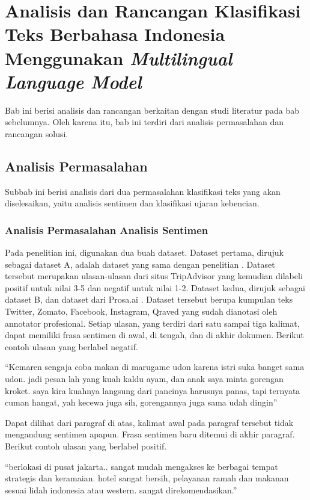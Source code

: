 \chapter{Analisis dan Rancangan Klasifikasi Teks Berbahasa Indonesia Menggunakan \textit{Multilingual Language Model}}

Bab ini berisi analisis dan rancangan berkaitan dengan studi literatur pada bab sebelumnya. Oleh karena itu, bab ini terdiri dari analisis permasalahan dan rancangan solusi.

\section{Analisis Permasalahan}
	Subbab ini berisi analisis dari dua permasalahan klasifikasi teks yang akan diselesaikan, yaitu analisis sentimen dan klasifikasi ujaran kebencian.

	\subsection{Analisis Permasalahan Analisis Sentimen}
	Pada penelitian ini, digunakan dua buah dataset. Dataset pertama, dirujuk sebagai dataset A, adalah dataset yang sama dengan penelitian \parencite{FarhanKhodra2017}. Dataset tersebut merupakan ulasan-ulasan dari situs TripAdvisor yang kemudian dilabeli positif untuk nilai 3-5 dan negatif untuk nilai 1-2. Dataset kedua, dirujuk sebagai dataset B,  dan dataset dari Prosa.ai \parencite{CrisdayantiPurwarianti2019}. Dataset tersebut berupa kumpulan teks Twitter, Zomato, Facebook, Instagram, Qraved yang sudah dianotasi oleh annotator profesional. Setiap ulasan, yang terdiri dari satu sampai tiga kalimat, dapat memiliki frasa sentimen di awal, di tengah, dan di akhir dokumen. Berikut contoh ulasan yang berlabel negatif.

	“Kemaren sengaja coba makan di marugame udon karena istri suka banget sama udon. jadi pesan lah yang kuah kaldu ayam, dan anak saya minta gorengan kroket. saya kira kuahnya langsung dari pancinya harusnya panas, tapi ternyata cuman hangat, yah kecewa juga sih, gorengannya juga sama udah dingin” 

	Dapat dilihat dari paragraf di atas, kalimat awal pada paragraf tersebut tidak mengandung sentimen apapun. Frasa sentimen baru ditemui di akhir paragraf. Berikut contoh ulasan yang berlabel positif.

	“berlokasi di pusat jakarta.. sangat mudah mengakses ke berbagai tempat strategis dan keramaian. hotel sangat bersih, pelayanan ramah dan makanan sesuai lidah indonesia atau western. sangat direkomendasikan.”

